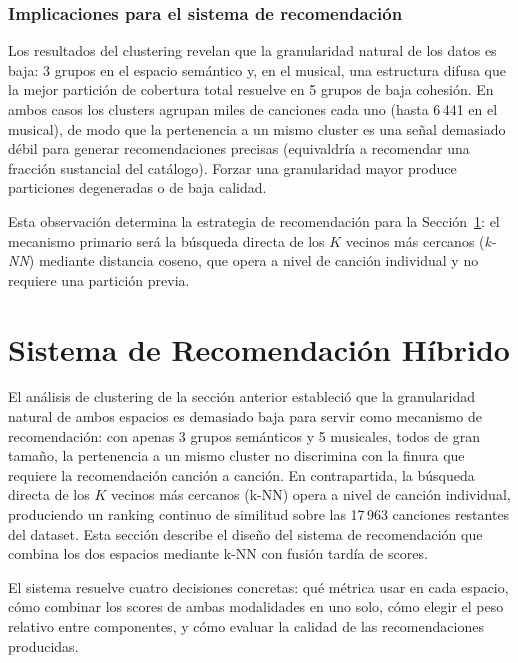 \subsubsection*{Implicaciones para el sistema de recomendación}

Los resultados del clustering revelan que la granularidad natural de los datos es baja: 3 grupos en el espacio semántico y, en el musical, una estructura difusa que la mejor partición de cobertura total resuelve en 5 grupos de baja cohesión. En ambos casos los clusters agrupan miles de canciones cada uno (hasta 6\,441 en el musical), de modo que la pertenencia a un mismo cluster es una señal demasiado débil para generar recomendaciones precisas (equivaldría a recomendar una fracción sustancial del catálogo). Forzar una granularidad mayor produce particiones degeneradas o de baja calidad.

Esta observación determina la estrategia de recomendación para la Sección~\ref{sec:sistema-hibrido}: el mecanismo primario será la búsqueda directa de los $K$ vecinos más cercanos (\textit{k-NN}) mediante distancia coseno, que opera a nivel de canción individual y no requiere una partición previa.

\section{Sistema de Recomendación Híbrido}
\label{sec:sistema-hibrido}

El análisis de clustering de la sección anterior estableció que la granularidad natural de ambos espacios es demasiado baja para servir como mecanismo de recomendación: con apenas 3 grupos semánticos y 5 musicales, todos de gran tamaño, la pertenencia a un mismo cluster no discrimina con la finura que requiere la recomendación canción a canción. En contrapartida, la búsqueda directa de los $K$ vecinos más cercanos (k-NN) opera a nivel de canción individual, produciendo un ranking continuo de similitud sobre las 17\,963 canciones restantes del dataset. Esta sección describe el diseño del sistema de recomendación que combina los dos espacios mediante k-NN con fusión tardía de scores.

El sistema resuelve cuatro decisiones concretas: qué métrica usar en cada espacio, cómo combinar los scores de ambas modalidades en uno solo, cómo elegir el peso relativo entre componentes, y cómo evaluar la calidad de las recomendaciones producidas.

